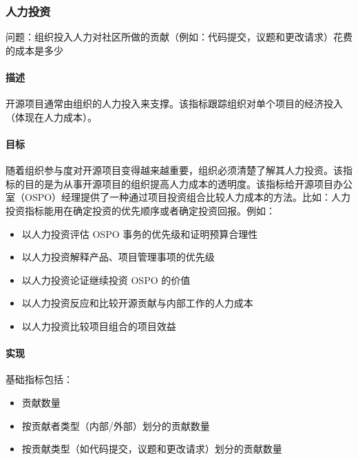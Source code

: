 \hypertarget{ux4ebaux529bux6295ux8d44}{%
\subsubsection{人力投资}\label{ux4ebaux529bux6295ux8d44}}

问题：组织投入人力对社区所做的贡献（例如：代码提交，议题和更改请求）花费的成本是多少

\hypertarget{ux63cfux8ff0}{%
\paragraph{描述}\label{ux63cfux8ff0}}

开源项目通常由组织的人力投入来支撑。该指标跟踪组织对单个项目的经济投入（体现在人力成本）。

\hypertarget{ux76eeux6807}{%
\paragraph{目标}\label{ux76eeux6807}}

随着组织参与度对开源项目变得越来越重要，组织必须清楚了解其人力投资。该指标的目的是为从事开源项目的组织提高人力成本的透明度。该指标给开源项目办公室（OSPO）经理提供了一种通过项目投资组合比较人力成本的方法。比如：人力投资指标能用在确定投资的优先顺序或者确定投资回报。例如：

\begin{itemize}
\tightlist
\item
  以人力投资评估 OSPO 事务的优先级和证明预算合理性
\item
  以人力投资解释产品、项目管理事项的优先级
\item
  以人力投资论证继续投资 OSPO 的价值
\item
  以人力投资反应和比较开源贡献与内部工作的人力成本
\item
  以人力投资比较项目组合的项目效益
\end{itemize}

\hypertarget{ux5b9eux73b0}{%
\paragraph{实现}\label{ux5b9eux73b0}}

基础指标包括：

\begin{itemize}
\tightlist
\item
  贡献数量
\item
  按贡献者类型（内部/外部）划分的贡献数量
\item
  按贡献类型（如代码提交，议题和更改请求）划分的贡献数量
\end{itemize}

